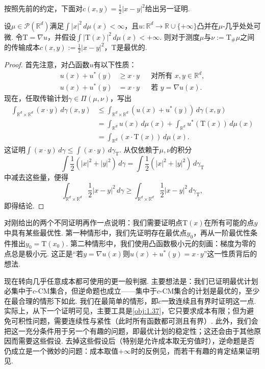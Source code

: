 按照先前的约定，下面对$c(x,y)=\frac12|x-y|^2$给出另一证明.

\begin{theorem}\label{obj:1.48}
设$\mu\in\mathscr P(\mathbb R^d)$满足$\int|x|^2\,d\mu(x)<\infty$，且$u:\mathbb R^d\to\mathbb R\cup\{+\infty\}$凸并在$\mu$-几乎处处可微. 令$\mathrm{T}=\nabla u$，并假设$\int|\mathrm{T}(x)|^2\,d\mu(x)<+\infty$. 则对于测度$\mu$与$\nu:=\mathrm{T}_\#\mu$之间的传输成本$c(x,y):=\frac12|x-y|^2$，$\mathrm{T}$是最优的.
\end{theorem}
\begin{proof}
首先注意，对凸函数$u$有以下性质：
\[
\begin{aligned}
u(x)+u^*(y)&\ge x\cdot y&&\text{对所有 }x,y\in\mathbb R^d,\\
u(x)+u^*(y)&=x\cdot y&&\text{若 }y=\nabla u(x).
\end{aligned}
\]
现在，任取传输计划$\gamma\in\Pi(\mu,\nu)$，写出
\begin{equation*}
\begin{aligned}
\int_{\mathbb R^d\times\mathbb R^d}(x\cdot y)\,d\gamma(x,y)
&\le\int_{\mathbb R^d\times\mathbb R^d}(u(x)+u^*(y))\,d\gamma(x,y)\\
&=\int_{\mathbb R^d}u(x)\,d\mu(x)
+\int_{\mathbb R^d}u^*(\mathrm{T}(x))\,d\mu(x)\\
&=\int_{\mathbb R^d}(x\cdot \mathrm{T}(x))\,d\mu(x).
\end{aligned}
\end{equation*}
这证明$\int(x\cdot y)\,d\gamma\le\int(x\cdot y)\,d\gamma_\mathrm{T}$. 从仅依赖于$\mu,\nu$的积分
\[
\int\frac12(|x|^2+|y|^2)\,d\gamma
=\int\frac12(|x|^2+|y|^2)\,d\gamma_\mathrm{T}
\]
中减去这些量，便得
\[
\int_{\mathbb R^d\times\mathbb R^d}\frac12|x-y|^2\,d\gamma
\ge\int_{\mathbb R^d\times\mathbb R^d}\frac12|x-y|^2\,d\gamma_\mathrm{T},
\]
即得结论.
\end{proof}

对刚给出的两个不同证明再作一点说明：我们需要证明点$\mathrm{T}(x)$在所有可能的点$y$中具有某些最优性. 第一种情形中，我们先证明存在最优点$y_0$，再从一阶最优性条件推出$y_0=\mathrm{T}(x_0)$. 第二种情形中，我们使用凸函数极小元的刻画：梯度为零的点总是极小元. 这正是“若$y=\nabla u(x)$则$u(x)+u^*(y)=x\cdot y$”这一性质背后的想法.

现在转向几乎任意成本都可使用的更一般判据. 主要想法是：我们已证明最优计划必集中于$c$-CM集合，但逆命题也成立——集中于$c$-CM集合的计划是最优的，至少在最合理的情形下如此. 我们在最简单的情形，即$c$一致连续且有界时证明这一点. 实际上，从下一个证明可见，主要工具是\autoref{obj:1.37}，它只要求成本有限；但为避免可积性问题，需要连续性与紧性（此时所有函数都可测且有界）. 此外，我们会把这一充分条件用于另一个有趣的问题，即最优计划的稳定性；这还会由于其他原因而需要这些假设. 去掉这些假设后（特别是允许成本取无穷值时），逆命题是否仍成立是一个微妙的问题：成本取值$+\infty$时的反例见\cite{b10}，而若干有趣的肯定结果证明见\cite{b30,b60,b254}.

